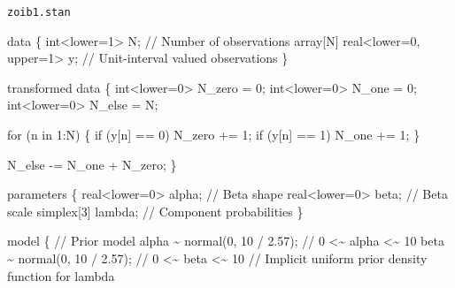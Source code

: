 \documentclass[
  letterpaper,
  DIV=11,
  numbers=noendperiod]{scrartcl}
\newenvironment{Shaded}{\begin{snugshade}}{\end{snugshade}}
\newcommand{\CommentTok}[1]{\textcolor[rgb]{0.37,0.37,0.37}{#1}}
\newcommand{\ControlFlowTok}[1]{\textcolor[rgb]{0.00,0.23,0.31}{#1}}
\newcommand{\DataTypeTok}[1]{\textcolor[rgb]{0.68,0.00,0.00}{#1}}
\newcommand{\DecValTok}[1]{\textcolor[rgb]{0.68,0.00,0.00}{#1}}
\newcommand{\FloatTok}[1]{\textcolor[rgb]{0.68,0.00,0.00}{#1}}
\newcommand{\KeywordTok}[1]{\textcolor[rgb]{0.00,0.23,0.31}{#1}}
\newcommand{\NormalTok}[1]{\textcolor[rgb]{0.00,0.23,0.31}{#1}}
\begin{document}
\begin{codelisting}

\caption{\texttt{zoib1.stan}}

\begin{Shaded}
\begin{Highlighting}[]
\KeywordTok{data}\NormalTok{ \{}
  \DataTypeTok{int}\NormalTok{\textless{}}\KeywordTok{lower}\NormalTok{=}\DecValTok{1}\NormalTok{\textgreater{} N;                    }\CommentTok{// Number of observations}
  \DataTypeTok{array}\NormalTok{[N] }\DataTypeTok{real}\NormalTok{\textless{}}\KeywordTok{lower}\NormalTok{=}\DecValTok{0}\NormalTok{, }\KeywordTok{upper}\NormalTok{=}\DecValTok{1}\NormalTok{\textgreater{} y; }\CommentTok{// Unit{-}interval valued observations}
\NormalTok{\}}

\KeywordTok{transformed data}\NormalTok{ \{}
  \DataTypeTok{int}\NormalTok{\textless{}}\KeywordTok{lower}\NormalTok{=}\DecValTok{0}\NormalTok{\textgreater{} N\_zero = }\DecValTok{0}\NormalTok{;}
  \DataTypeTok{int}\NormalTok{\textless{}}\KeywordTok{lower}\NormalTok{=}\DecValTok{0}\NormalTok{\textgreater{} N\_one = }\DecValTok{0}\NormalTok{;}
  \DataTypeTok{int}\NormalTok{\textless{}}\KeywordTok{lower}\NormalTok{=}\DecValTok{0}\NormalTok{\textgreater{} N\_else = N;}

  \ControlFlowTok{for}\NormalTok{ (n }\ControlFlowTok{in} \DecValTok{1}\NormalTok{:N) \{}
    \ControlFlowTok{if}\NormalTok{ (y[n] == }\DecValTok{0}\NormalTok{) N\_zero += }\DecValTok{1}\NormalTok{;}
    \ControlFlowTok{if}\NormalTok{ (y[n] == }\DecValTok{1}\NormalTok{) N\_one  += }\DecValTok{1}\NormalTok{;}
\NormalTok{  \}}

\NormalTok{  N\_else {-}= N\_one + N\_zero;}
\NormalTok{\}}

\KeywordTok{parameters}\NormalTok{ \{}
  \DataTypeTok{real}\NormalTok{\textless{}}\KeywordTok{lower}\NormalTok{=}\DecValTok{0}\NormalTok{\textgreater{} alpha; }\CommentTok{// Beta shape}
  \DataTypeTok{real}\NormalTok{\textless{}}\KeywordTok{lower}\NormalTok{=}\DecValTok{0}\NormalTok{\textgreater{}  beta; }\CommentTok{// Beta scale}
  \DataTypeTok{simplex}\NormalTok{[}\DecValTok{3}\NormalTok{]   lambda; }\CommentTok{// Component probabilities}
\NormalTok{\}}

\KeywordTok{model}\NormalTok{ \{}
  \CommentTok{// Prior model}
\NormalTok{  alpha \textasciitilde{} normal(}\DecValTok{0}\NormalTok{, }\DecValTok{10}\NormalTok{ / }\FloatTok{2.57}\NormalTok{); }\CommentTok{// 0 \textless{}\textasciitilde{} alpha \textless{}\textasciitilde{} 10}
\NormalTok{  beta \textasciitilde{} normal(}\DecValTok{0}\NormalTok{, }\DecValTok{10}\NormalTok{ / }\FloatTok{2.57}\NormalTok{);  }\CommentTok{// 0 \textless{}\textasciitilde{} beta  \textless{}\textasciitilde{} 10}
  \CommentTok{// Implicit uniform prior density function for lambda}


\end{Highlighting}
\end{Shaded}
\end{codelisting}
\end{document}

